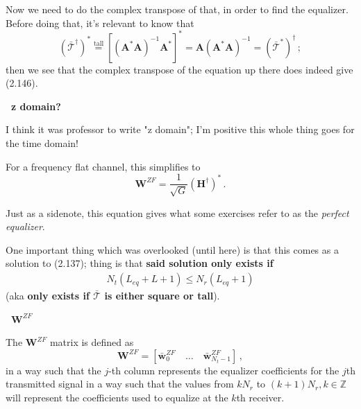 \documentclass[a4paper, 12pt]{book}
\begin{document}
Now we need to do the complex transpose of that, in order to find the equalizer.\\
Before doing that, it's relevant to know that
\[
(\bar{\mathcal{T}}^\dagger)^* \overset{\text{tall}}{=} [(\boldsymbol{A}^*\boldsymbol{A})^{-1}\boldsymbol{A}^*]^* = \boldsymbol{A}(\boldsymbol{A}^*\boldsymbol{A})^{-1} = (\bar{\mathcal{T}}^*)^{\dagger} \,;
\]
then we see that the complex transpose of the equation up there does indeed give (2.146).

\begin{tcolorbox}[colback=obsidianPurple, colframe=white, boxrule=0pt, sharp corners]
    \textcolor{obsidianTextPurple}{\textbf{\faQuestionCircle\ z domain?}}
    
    I think it was professor to write "z domain"; I'm positive this whole thing goes for the time domain!
\end{tcolorbox}

For a frequency flat channel, this simplifies to
\[ \mathbf{W}^{ZF} = \frac{1}{\sqrt{G}} (\mathbf{H}^{\dagger})^* \,. \]

\begin{tcolorbox}[colback=obsidianGreen, colframe=white, boxrule=0pt, sharp corners]
    Just as a sidenote, this equation gives what some exercises refer to as the \textit{perfect equalizer}.
\end{tcolorbox}

One important thing which was overlooked (until here) is that this comes as a solution to (2.137); thing is that \textbf{said solution only exists if}
\begin{align}
    N_t(L_{eq} + L + 1) \leq N_r(L_{eq} + 1) \tag{2.146+}
\end{align}
(aka \textbf{only exists if $\bar{\mathcal{T}}$ is either square or tall}).

\begin{tcolorbox}[colback=obsidianBlue, colframe=white, boxrule=0pt, sharp corners]
    \textcolor{obsidianTextBlue}{\textbf{\faAtom\ $\mathbf{W}^{ZF}$}}
    
    The $\mathbf{W}^{ZF}$ matrix is defined as
    \[ \mathbf{W}^{ZF} = [\bar{\mathbf{w}}_0^{ZF} \quad \dots \quad \bar{\mathbf{w}}_{N_t-1}^{ZF}] \,, \]
    in a way such that the $j$-th column represents the equalizer coefficients for the $j$th transmitted signal in a way such that the values from $kN_r$ to $(k+1)N_r, k \in \mathbb{Z}$ will represent the coefficients used to equalize at the $k$th receiver.
\end{tcolorbox}
\end{document}
